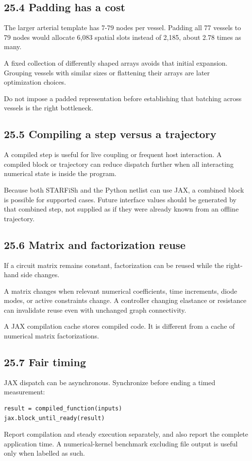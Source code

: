\documentclass[11pt,a4paper]{article}
\begin{document}
\subsection{25.4 Padding has a cost}
The larger arterial template has 7-79 nodes per vessel. Padding all 77 vessels to 79 nodes would allocate 6,083 spatial slots instead of 2,185, about 2.78 times as many.

A fixed collection of differently shaped arrays avoids that initial expansion. Grouping vessels with similar sizes or flattening their arrays are later optimization choices.

Do not impose a padded representation before establishing that batching across vessels is the right bottleneck.

\subsection{25.5 Compiling a step versus a trajectory}
A compiled step is useful for live coupling or frequent host interaction. A compiled block or trajectory can reduce dispatch further when all interacting numerical state is inside the program.

Because both STARFiSh and the Python netlist can use JAX, a combined block is possible for supported cases. Future interface values should be generated by that combined step, not supplied as if they were already known from an offline trajectory.

\subsection{25.6 Matrix and factorization reuse}
If a circuit matrix remains constant, factorization can be reused while the right-hand side changes.

A matrix changes when relevant numerical coefficients, time increments, diode modes, or active constraints change. A controller changing elastance or resistance can invalidate reuse even with unchanged graph connectivity.

A JAX compilation cache stores compiled code. It is different from a cache of numerical matrix factorizations.

\subsection{25.7 Fair timing}
JAX dispatch can be asynchronous. Synchronize before ending a timed measurement:


\begin{lstlisting}
result = compiled_function(inputs)
jax.block_until_ready(result)
\end{lstlisting}
Report compilation and steady execution separately, and also report the complete application time. A numerical-kernel benchmark excluding file output is useful only when labelled as such.
\end{document}
